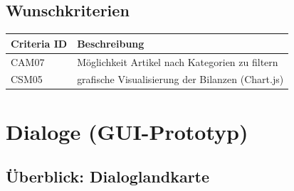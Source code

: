 \documentclass[a4paper]{article}
\begin{document}

\subsection{Wunschkriterien}

\begin{longtable}{|p{100px}|p{250px}|}
	\hline
	\rowcolor[HTML]{C0C0C0}
	Criteria ID & Beschreibung \\ \hline
	CAM07 & Möglichkeit Artikel nach Kategorien zu filtern  \\ \hline
	CSM05 & grafische Visualisierung der Bilanzen (Chart.js)  \\ \hline
\end{longtable}

\newpage

\section{Dialoge (GUI-Prototyp)}

\subsection{Überblick: Dialoglandkarte}
\end{document}
